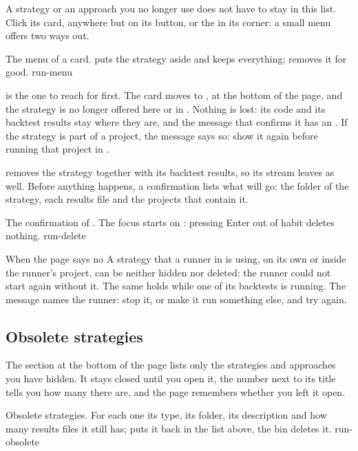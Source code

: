 A strategy or an approach you no longer use does not have to stay in this
list. Click its card, anywhere but on its button, or the \voce{$\cdots$} in
its corner: a small menu offers two ways out.

  {The menu of a card.  puts the strategy aside and keeps
   everything;  removes it for good.}
  {run-menu}

 is the one to reach for first. The card moves to
, at the bottom of the page, and the strategy is no
longer offered here or in . Nothing is lost: its code and its
backtest results stay where they are, and the message that confirms it has an
. If the strategy is part of a project, the message says so:
show it again before running that project in .

 removes the strategy together with its backtest results, so its
stream leaves  as well. Before anything happens, a confirmation
lists what will go: the folder of the strategy, each results file and the
projects that contain it.

  {The confirmation of . The focus starts on
   : pressing Enter out of habit deletes nothing.}
  {run-delete}

\begin{attenzione}{When the page says no}
A strategy that a runner in  is using, on its own or inside the
runner's project, can be neither hidden nor deleted: the runner could not
start again without it. The same holds while one of its backtests is running.
The message names the runner: stop it, or make it run something else, and try
again.
\end{attenzione}

\subsection{Obsolete strategies}\label{sez:run-obsolete}

The section at the bottom of the page lists only the strategies and
approaches you have hidden. It stays closed until you open it, the number next
to its title tells you how many there are, and the page remembers whether you
left it open.

  {Obsolete strategies. For each one its type, its folder, its description
   and how many results files it still has;  puts it
   back in the list above, the bin deletes it.}
  {run-obsolete}

